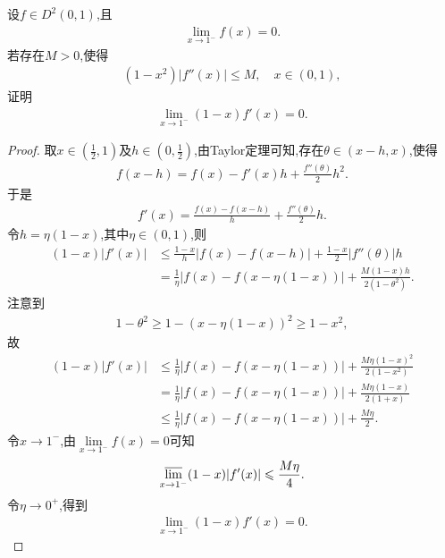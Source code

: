\documentclass[../../main.tex]{subfiles}%
\begin{document}
\begin{example}
设$f\in D^2(0,1)$,且
\begin{align*}
\lim\limits_{x\to1^-}f(x)=0.
\end{align*}
若存在$M>0$,使得
\begin{align*}
(1-x^2)|f''(x)|\leqslant M,\quad x\in(0,1),
\end{align*}
证明
\begin{align*}
\lim\limits_{x\to1^-}(1-x)f'(x)=0.
\end{align*}
\end{example}
\begin{proof}
取$x\in\left(\frac{1}{2},1\right)$及$h\in\left(0,\frac{1}{2}\right)$,由Taylor定理可知,存在$\theta\in(x-h,x)$,使得
\begin{align*}
f(x-h)=f(x)-f'(x)h+\frac{f''(\theta)}{2}h^2.
\end{align*}
于是
\begin{align*}
f'(x)=\frac{f(x)-f(x-h)}{h}+\frac{f''(\theta)}{2}h.
\end{align*}
令$h=\eta(1-x)$,其中$\eta\in(0,1)$,则
\begin{align*}
(1-x)|f'(x)|
&\leqslant
\frac{1-x}{h}|f(x)-f(x-h)|
+\frac{1-x}{2}|f''(\theta)|h\\
&=\frac{1}{\eta}|f(x)-f(x-\eta(1-x))|
+\frac{M(1-x)h}{2(1-\theta^2)}.
\end{align*}
注意到
\begin{align*}
1-\theta^2\geqslant1-(x-\eta(1-x))^2
\geqslant1-x^2,
\end{align*}
故
\begin{align*}
(1-x)|f' (x)|&\leqslant \frac{1}{\eta}|f(x)-f(x-\eta (1-x))|+\frac{M\eta (1-x)^2}{2(1-x^2)}
\\
&=\frac{1}{\eta}|f(x)-f(x-\eta (1-x))|+\frac{M\eta \left( 1-x \right)}{2\left( 1+x \right)}\\
&\leqslant \frac{1}{\eta}|f(x)-f(x-\eta (1-x))|+\frac{M\eta}{2}.
\end{align*}
令$x\to1^-$,由$\lim\limits_{x\to1^-}f(x)=0$可知
\begin{align*}
\varlimsup\limits_{x\to1^-}(1-x)|f'(x)|
\leqslant\frac{M\eta}{4}.
\end{align*}
令$\eta\to0^+$,得到
\begin{align*}
\lim\limits_{x\to1^-}(1-x)f'(x)=0.
\end{align*}
\end{proof}
\end{document}
